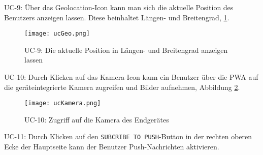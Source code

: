 UC-9:
Über das Geolocation-Icon kann man sich die aktuelle Position des Benutzers anzeigen lassen. Diese beinhaltet Längen- und Breitengrad, \ref{uc9}.\\
\begin{figure}[!htb]
    \centering
    \texttt{[image: ucGeo.png]}
    \caption{UC-9: Die aktuelle Position in Längen- und Breitengrad anzeigen lassen}
    \label{uc9}
\end{figure}

\newpage

UC-10:
Durch Klicken auf das Kamera-Icon kann ein Benutzer über die PWA auf die geräteintegrierte Kamera zugreifen und Bilder aufnehmen, Abbildung \ref{uc10}.\\

\begin{figure}[!htb]
    \centering
    \texttt{[image: ucKamera.png]}
    \caption{UC-10: Zugriff auf die Kamera des Endgerätes}
    \label{uc10}
\end{figure}


UC-11:
Durch Klicken auf den \texttt{SUBCRIBE TO PUSH}-Button in der rechten oberen Ecke der Hauptseite kann der Benutzer Push-Nachrichten aktivieren.


